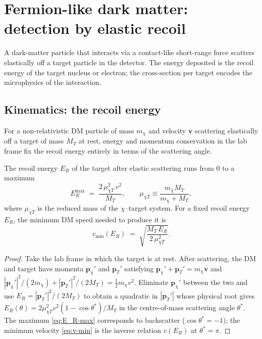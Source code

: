\section{Fermion-like dark matter: detection by elastic recoil}
\label{sec:fermion-dm}

\begin{phenomenon}
A dark-matter particle that interacts via a contact-like
short-range force scatters elastically off a target particle in the
detector. The energy deposited is the recoil energy of the target
nucleus or electron; the cross-section per target encodes the
microphysics of the interaction.
\end{phenomenon}

\subsection{Kinematics: the recoil energy}
\label{sec:recoil-kinematics}

For a non-relativistic DM particle of mass $m_\chi$ and velocity
$\bm v$ scattering elastically off a target of mass $M_T$ at rest,
energy and momentum conservation in the lab frame fix the recoil
energy entirely in terms of the scattering angle.

\begin{statement}
\label{stmt:recoil-energy}
The recoil energy $E_R$ of the target after elastic scattering
runs from $0$ to a maximum
\begin{equation}
\label{eq:E_R-max}
E_R^\text{max} \;=\; \frac{2\,\mu_{\chi T}^2\,v^2}{M_T},
\qquad
\mu_{\chi T}\equiv\frac{m_\chi M_T}{m_\chi+M_T},
\end{equation}
where $\mu_{\chi T}$ is the reduced mass of the $\chi$--target
system. For a fixed recoil energy $E_R$, the minimum DM speed
needed to produce it is
\begin{equation}
\label{eq:v-min}
v_\text{min}(E_R) \;=\; \sqrt{\frac{M_T\,E_R}{2\,\mu_{\chi T}^2}}.
\end{equation}
\end{statement}

\begin{proof}
Take the lab frame in which the target is at rest. After
scattering, the DM and target have momenta $\bm p_\chi'$ and
$\bm p_T'$ satisfying
$\bm p_\chi'+\bm p_T'=m_\chi\bm v$ and
$|\bm p_\chi'|^2/(2m_\chi)+|\bm p_T'|^2/(2 M_T)=\tfrac12 m_\chi v^2$.
Eliminate $\bm p_\chi'$ between the two and use
$E_R=|\bm p_T'|^2/(2M_T)$ to obtain a quadratic in
$|\bm p_T'|$ whose physical root gives
$E_R(\theta)=2\mu_{\chi T}^2 v^2(1-\cos\theta^*)/M_T$ in the
centre-of-mass scattering angle $\theta^*$. The maximum
\cref{eq:E_R-max} corresponds to backscatter
($\cos\theta^*=-1$); the minimum velocity \cref{eq:v-min} is the
inverse relation $v(E_R)$ at $\theta^*=\pi$.
\end{proof}

